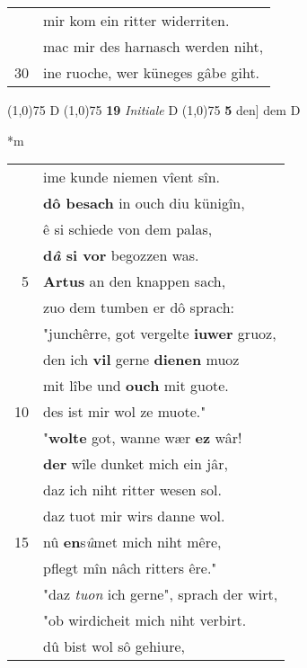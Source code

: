 \documentclass[8pt,a4paper,notitlepage]{article}
\begin{document}
\begin{table}[ht]
\begin{minipage}[t]{0.5\linewidth}
\begin{tabular}{rl}
 & mir kom ein ritter widerriten.\\ 
 & mac mir des harnasch werden niht,\\ 
30 & ine ruoche, wer küneges gâbe giht.\\ 
\end{tabular}
\scriptsize
\line(1,0){75} \newline
D \newline
\line(1,0){75} \newline
\textbf{19} \textit{Initiale} D  \newline
\line(1,0){75} \newline
\textbf{5} den] dem D \newline
\end{minipage}
\hspace{0.5cm}
\begin{minipage}[t]{0.5\linewidth}
\small
\begin{center}*m
\end{center}
\begin{tabular}{rl}
 & ime kunde niemen vîent sîn.\\ 
 & \textbf{dô besach} in ouch diu künigîn,\\ 
 & ê si schiede von dem palas,\\ 
 & \textbf{d\textit{â} si vor} begozzen was.\\ 
5 & \textbf{Artus} an den knappen sach,\\ 
 & zuo dem tumben er dô sprach:\\ 
 & "junchêrre, got vergelte \textbf{iuwer} gruoz,\\ 
 & den ich \textbf{vil} gerne \textbf{dienen} muoz\\ 
 & mit lîbe und \textbf{ouch} mit guote.\\ 
10 & des ist mir wol ze muote."\\ 
 & "\textbf{wolte} got, wanne wær \textbf{ez} wâr!\\ 
 & \textbf{der} wîle dunket mich ein jâr,\\ 
 & daz ich niht ritter wesen sol.\\ 
 & daz tuot mir wirs danne wol.\\ 
15 & nû \textbf{en}s\textit{û}met mich niht mêre,\\ 
 & pflegt mîn nâch ritters êre."\\ 
 & "daz \textit{tuon} ich gerne", sprach der wirt,\\ 
 & "ob wirdicheit mich niht verbirt.\\ 
 & dû bist wol sô gehiure,\\ 

\end{tabular}
\end{minipage}
\end{table}
\end{document}
